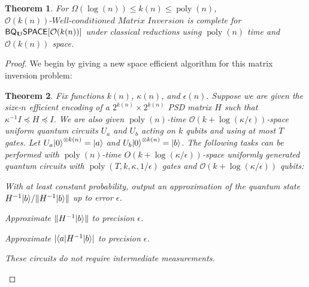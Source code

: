 \documentclass[11pt]{article}
\newtheorem{theorem}{Theorem}
\theoremstyle{definition}
\theoremstyle{remark}
\newcommand\BQSPACE{{\sf{BQSPACE}}}
\newcommand\matrixinvert[1]{{\ensuremath{#1}}\textit{-Well-conditioned Matrix Inversion}}
\newcommand{\classfont}{\sf}
\newcommand{\Unitary}{\mathbf{U}}
\newcommand{\unitaryBQSPACE}[1]{{\classfont{BQ}_\Unitary\classfont{SPACE}}[#1]}
\newcommand\bigoh{\mathcal{O}}
\DeclareMathOperator{\poly}{poly}
\begin{document}
\begin{theorem} \label{thm: matrix invert}
For $\Omega(\log(n)) \le k(n) \le \poly(n)$, $\matrixinvert{\mathcal{O}(k(n))}$ is complete for $\unitaryBQSPACE{\mathcal{O}(k(n))}$ under classical reductions using $\poly(n)$ time and $\mathcal{O}(k(n))$ space.
\end{theorem}
\begin{proof}
We begin by giving a new space efficient algorithm for this matrix inversion problem:

\begin{theorem} \label{thm: matrix inversion alg}
Fix functions $k(n)$, $\kappa(n)$, and $\epsilon(n)$. Suppose we are given the size-$n$ efficient encoding of a $2^{k(n)} \times 2^{k(n)}$ PSD matrix $H$ such that $\kappa^{-1} I \preceq H \preceq I$. We are also given $\poly(n)$-time $\mathcal{O}(k+\log(\kappa/\epsilon))$-space uniform quantum circuits $U_a$ and $U_b$ acting on $k$ qubits and using at most $T$ gates. Let $U_a{\left\vert{0}\right\rangle}^{\otimes k(n)} = {\left\vert{a}\right\rangle}$ and $U_b{\left\vert{0}\right\rangle}^{\otimes k(n)} = {\left\vert{b}\right\rangle}$. The following tasks can be performed with $\poly(n)$-time $O(k+\log(\kappa/\epsilon))$-space uniformly generated quantum circuits with $\poly(T,k,\kappa,1/\epsilon)$ gates and $\bigoh (k+\log(\kappa/\epsilon))$ qubits:
\begin{compactenum}
\item With at least constant probability, output an approximation of the quantum state $H^{-1}{\left\vert{b}\right\rangle} / \|H^{-1}{\left\vert{b}\right\rangle}\|$ up to error $\epsilon$.
\item Approximate $\|H^{-1}{\left\vert{b}\right\rangle}\|$ to precision $\epsilon$.
\item Approximate $|{\left\langle{a}\right\vert}H^{-1}{\left\vert{b}\right\rangle}|$ to precision $\epsilon$.
\end{compactenum}
These circuits do not require intermediate measurements.
\end{theorem}


\end{proof}
\end{document}
